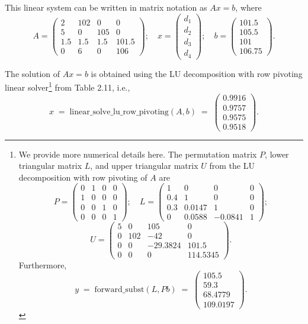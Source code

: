 \begin{examplex}
This linear system can be written in matrix notation as $Ax=b$, where
\[
A = \begin{pmatrix} 2 & 102 & 0 & 0\\ 5 & 0 & 105 & 0\\ 1.5 & 1.5 & 1.5 & 101.5\\
0 & 6 & 0 & 106\end{pmatrix}; \quad
x = \begin{pmatrix} d_1\\ d_2\\ d_3\\ d_4\end{pmatrix}; \quad
b = \begin{pmatrix} 101.5\\ 105.5\\ 101\\ 106.75\end{pmatrix}.
\]

The solution of $Ax=b$ is obtained using the LU decomposition with row pivoting
linear solver\footnote{We provide more numerical details here. The permutation
matrix $P$, lower triangular matrix $L$, and upper triangular matrix $U$ from the
LU decomposition with row pivoting of $A$ are
\[
P = \begin{pmatrix} 0&1&0&0\\ 1&0&0&0\\ 0&0&1&0\\ 0&0&0&1\end{pmatrix}; \quad
L = \begin{pmatrix} 1&0&0&0\\ 0.4&1&0&0\\ 0.3&0.0147&1&0\\
0&0.0588&-0.0841&1\end{pmatrix};
\]
\[
U = \begin{pmatrix} 5&0&105&0\\ 0&102&-42&0\\ 0&0&-29.3824&101.5\\
0&0&0&114.5345\end{pmatrix}.
\]
Furthermore,
\[
y \;=\; \text{forward\_subst}(L,Pb) \;=\; \begin{pmatrix} 105.5\\ 59.3\\ 68.4779\\
109.0197\end{pmatrix}.
\]} from Table 2.11, i.e.,
\[
x \;=\; \text{linear\_solve\_lu\_row\_pivoting}(A,b) \;=\; \begin{pmatrix} 0.9916\\
0.9757\\ 0.9575\\ 0.9518\end{pmatrix}.
\]


\end{examplex}
